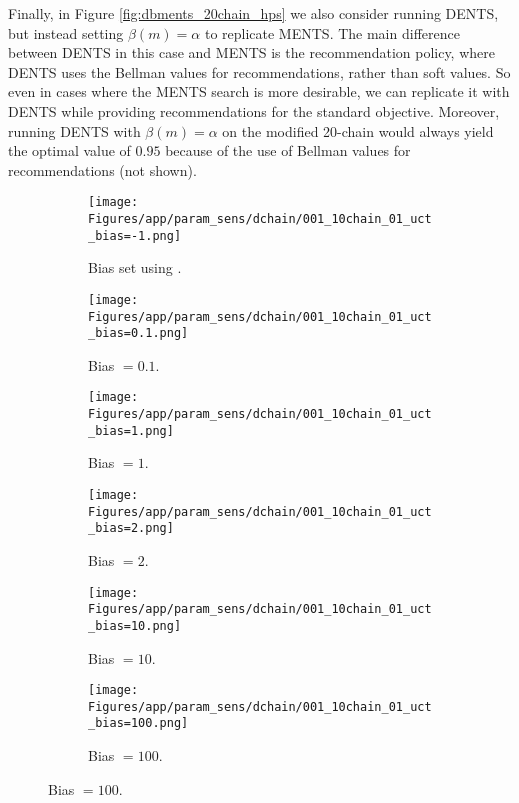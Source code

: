 \documentclass{article}
\theoremstyle{plain}
\begin{document}
\begin{appendices}
            Finally, in Figure \ref{fig:dbments_20chain_hps} we also consider running DENTS, but instead setting $\beta(m)=\alpha$ to replicate MENTS. The main difference between DENTS in this case and MENTS is the recommendation policy, where DENTS uses the Bellman values for recommendations, rather than soft values. So even in cases where the MENTS search is more desirable, we can replicate it with DENTS while providing recommendations for the standard objective. Moreover, running DENTS with $\beta(m)=\alpha$ on the modified 20-chain would always yield the optimal value of $0.95$ because of the use of Bellman values for recommendations (not shown).



            \FloatBarrier


            \begin{figure}
                \centering
                
                \begin{subfigure}[b]{0.32\textwidth}
                    \centering
                    \texttt{[image: Figures/app/param\_sens/dchain/001\_10chain\_01\_uct\_bias=-1.png]}
                    \caption*{Bias set using \cite{prst}.}
                \end{subfigure}
                \begin{subfigure}[b]{0.32\textwidth}
                    \centering
                    \texttt{[image: Figures/app/param\_sens/dchain/001\_10chain\_01\_uct\_bias=0.1.png]}
                    \caption*{Bias $=0.1$.}
                \end{subfigure}
                \begin{subfigure}[b]{0.32\textwidth}
                    \centering
                    \texttt{[image: Figures/app/param\_sens/dchain/001\_10chain\_01\_uct\_bias=1.png]}
                    \caption*{Bias $=1$.}
                \end{subfigure}
                
                \begin{subfigure}[b]{0.32\textwidth}
                    \centering
                    \texttt{[image: Figures/app/param\_sens/dchain/001\_10chain\_01\_uct\_bias=2.png]}
                    \caption*{Bias $=2$.}
                \end{subfigure}
                \begin{subfigure}[b]{0.32\textwidth}
                    \centering
                    \texttt{[image: Figures/app/param\_sens/dchain/001\_10chain\_01\_uct\_bias=10.png]}
                    \caption*{Bias $=10$.}
                \end{subfigure}
                \begin{subfigure}[b]{0.32\textwidth}
                    \centering
                    \texttt{[image: Figures/app/param\_sens/dchain/001\_10chain\_01\_uct\_bias=100.png]}
                    \caption*{Bias $=100$.}
                \end{subfigure}
                

\end{figure}
\end{appendices}
\end{document}
